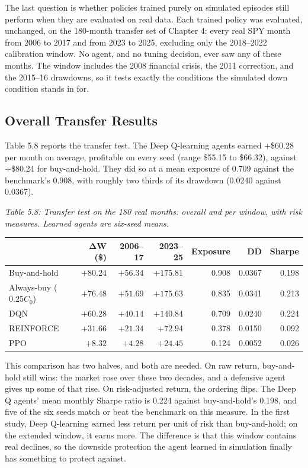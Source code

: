 The last question is whether policies trained purely on simulated
episodes still perform when they are evaluated on real data. Each trained policy was
evaluated, unchanged, on the 180-month transfer set of Chapter 4: every
real SPY month from 2006 to 2017 and from 2023 to 2025, excluding only
the 2018--2022 calibration window. No agent, and no tuning decision,
ever saw any of these months. The window includes the 2008 financial
crisis, the 2011 correction, and the 2015--16 drawdowns, so it tests
exactly the conditions the simulated down condition stands in for.

\subsection{Overall Transfer Results}

Table 5.8 reports the transfer test. The Deep Q-learning agents earned
+\$60.28 per month on average, profitable on every seed (range \$55.15
to \$66.32), against +\$80.24 for buy-and-hold. They did so at a mean
exposure of 0.709 against the benchmark's 0.908, with roughly two thirds
of its drawdown (0.0240 against 0.0367).

\emph{Table 5.8: Transfer test on the 180 real months: overall and per
window, with risk measures. Learned agents are six-seed means.}

{\def\LTcaptype{none}
\begin{longtable}[]{@{}lrrrrrr@{}}
\toprule\noalign{}
 & \textbf{ΔW (\$)} & \textbf{2006--17} & \textbf{2023--25} &
\textbf{Exposure} & \textbf{DD} & \textbf{Sharpe} \\
\midrule\noalign{}
\endhead
\bottomrule\noalign{}
\endlastfoot
Buy-and-hold & \(+80.24\) & \(+56.34\) & \(+175.81\) & 0.908 & 0.0367 & 0.198 \\
Always-buy (\(0.25C_{0}\)) & \(+76.48\) & \(+51.69\) & \(+175.63\) & 0.835 & 0.0341 & 0.213 \\
DQN & \(+60.28\) & \(+40.14\) & \(+140.84\) & 0.709 & 0.0240 & 0.224 \\
REINFORCE & \(+31.66\) & \(+21.34\) & \(+72.94\) & 0.378 & 0.0150 & 0.092 \\
PPO & \(+8.32\) & \(+4.28\) & \(+24.45\) & 0.124 & 0.0052 & 0.026 \\
\end{longtable}
}

This comparison has two halves, and both are needed. On raw return,
buy-and-hold still wins: the market rose over these two decades, and a
defensive agent gives up some of that rise. On risk-adjusted return, the
ordering flips. The Deep Q agents' mean monthly Sharpe ratio is 0.224
against buy-and-hold's 0.198, and five of the six seeds match or beat
the benchmark on this measure. In the first study, Deep Q-learning earned less
return per unit of risk than buy-and-hold; on the extended window, it
earns more. The difference is that this window contains real declines,
so the downside protection the agent learned in simulation finally has
something to protect against.

